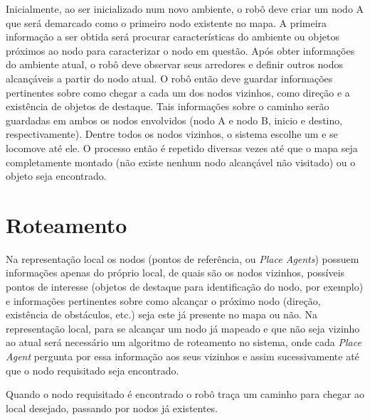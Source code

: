 Inicialmente, ao ser inicializado num novo ambiente, o robô deve criar um nodo A que será demarcado como o primeiro nodo existente no mapa. A primeira informação a ser obtida será procurar características do ambiente ou objetos próximos ao nodo para caracterizar o nodo em questão. Após obter informações do ambiente atual, o robô deve observar seus arredores e definir outros nodos alcançáveis a partir do nodo atual. O robô então deve guardar informações pertinentes sobre como chegar a cada um dos nodos vizinhos, como direção e a existência de objetos de destaque. Tais informações sobre o caminho serão guardadas em ambos os nodos envolvidos (nodo A e nodo B, inicio e destino, respectivamente). Dentre todos os nodos vizinhos, o sistema escolhe um e se locomove até ele. O processo então é repetido diversas vezes até que o mapa seja completamente montado (não existe nenhum nodo alcançável não visitado) ou o objeto seja encontrado.

\section{Roteamento}

Na representação local os nodos (pontos de referência, ou \textit{Place Agents}) possuem informações apenas do próprio local, de quais são os nodos vizinhos, possíveis pontos de interesse (objetos de destaque para identificação do nodo, por exemplo) e informações pertinentes sobre como alcançar o próximo nodo (direção, existência de obstáculos, etc.) seja este já presente no mapa ou não. Na representação local, para se alcançar um nodo já mapeado e que não seja vizinho ao atual será necessário um algoritmo de roteamento no sistema, onde cada \textit{Place Agent} pergunta por essa informação aos seus vizinhos e assim sucessivamente até que o nodo requisitado seja encontrado.

Quando o nodo requisitado é encontrado o robô traça um caminho para chegar ao local desejado, passando por nodos já existentes. 
